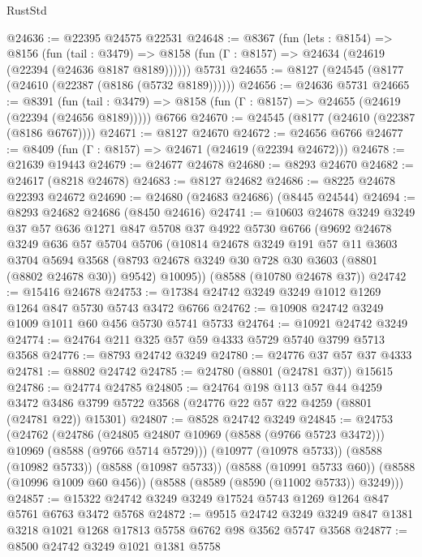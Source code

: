 \begin{lexlean}{RustStd}
\begin{coremodule}
@24636 := @22395 @24575 @22531
@24648 := @8367
    (fun (lets : @8154) =>
    @8156
      (fun (tail : @3479) =>
      @8158 (fun (Γ : @8157) => @24634 (@24619 (@22394 (@24636 @8187 @8189))))))
    @5731
@24655 := @8127 (@24545 (@8177 (@24610 (@22387 (@8186 (@5732 @8189))))))
@24656 := @24636 @5731
@24665 := @8391
    (fun (tail : @3479) => @8158 (fun (Γ : @8157) => @24655 (@24619 (@22394 (@24656 @8189)))))
    @6766
@24670 := @24545 (@8177 (@24610 (@22387 (@8186 @6767))))
@24671 := @8127 @24670
@24672 := @24656 @6766
@24677 := @8409 (fun (Γ : @8157) => @24671 (@24619 (@22394 @24672)))
@24678 := @21639 @19443
@24679 := @24677 @24678
@24680 := @8293 @24670
@24682 := @24617 (@8218 @24678)
@24683 := @8127 @24682
@24686 := @8225 @24678 @22393 @24672
@24690 := @24680 (@24683 @24686) (@8445 @24544)
@24694 := @8293 @24682 @24686 (@8450 @24616)
@24741 := @10603
    @24678
    @3249
    @3249
    @37
    @57
    @636
    @1271
    @847
    @5708
    @37
    @4922
    @5730
    @6766
    (@9692
      @24678
      @3249
      @636
      @57
      @5704
      @5706
      (@10814
        @24678
        @3249
        @191
        @57
        @11
        @3603
        @3704
        @5694
        @3568
        (@8793 @24678 @3249 @30 @728 @30 @3603 (@8801 (@8802 @24678 @30)) @9542)
        @10095))
    (@8588 (@10780 @24678 @37))
@24742 := @15416 @24678
@24753 := @17384 @24742 @3249 @3249 @1012 @1269 @1264 @847 @5730 @5743 @3472 @6766
@24762 := @10908 @24742 @3249 @1009 @1011 @60 @456 @5730 @5741 @5733
@24764 := @10921 @24742 @3249
@24774 := @24764 @211 @325 @57 @59 @4333 @5729 @5740 @3799 @5713 @3568
@24776 := @8793 @24742 @3249
@24780 := @24776 @37 @57 @37 @4333
@24781 := @8802 @24742
@24785 := @24780 (@8801 (@24781 @37)) @15615
@24786 := @24774 @24785
@24805 := @24764
    @198
    @113
    @57
    @44
    @4259
    @3472
    @3486
    @3799
    @5722
    @3568
    (@24776 @22 @57 @22 @4259 (@8801 (@24781 @22)) @15301)
@24807 := @8528 @24742 @3249
@24845 := @24753
    (@24762
      (@24786 (@24805 @24807 @10969 (@8588 (@9766 @5723 @3472))) @10969 (@8588 (@9766 @5714 @5729)))
      (@10977 (@10978 @5733))
      (@8588 (@10982 @5733))
      (@8588 (@10987 @5733))
      (@8588 (@10991 @5733 @60))
      (@8588 (@10996 @1009 @60 @456))
      (@8588 (@8589 (@8590 (@11002 @5733)) @3249)))
@24857 := @15322 @24742 @3249 @3249 @17524 @5743 @1269 @1264 @847 @5761 @6763 @3472 @5768
@24872 := @9515
    @24742
    @3249
    @3249
    @847
    @1381
    @3218
    @1021
    @1268
    @17813
    @5758
    @6762
    @98
    @3562
    @5747
    @3568
@24877 := @8500 @24742 @3249 @1021 @1381 @5758

\end{coremodule}
\end{lexlean}
